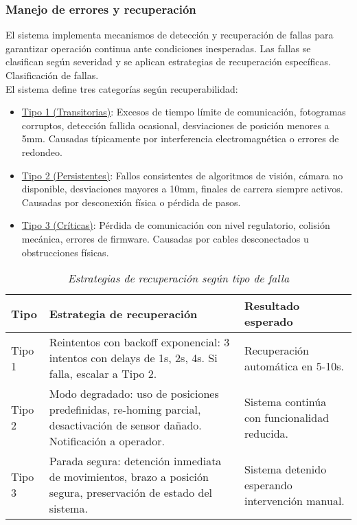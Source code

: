 \subsubsection{Manejo de errores y recuperación}

El sistema implementa mecanismos de detección y recuperación de fallas para garantizar operación continua ante condiciones inesperadas. Las fallas se clasifican según severidad y se aplican estrategias de recuperación específicas.\\

Clasificación de fallas.\\
\noindent
El sistema define tres categorías según recuperabilidad:

\begin{itemize}[label=$\bullet$]
    \item \underline{Tipo 1 (Transitorias)}: Excesos de tiempo límite de comunicación, fotogramas corruptos, detección fallida ocasional, desviaciones de posición menores a 5mm. Causadas típicamente por interferencia electromagnética o errores de redondeo.

    \item \underline{Tipo 2 (Persistentes)}: Fallos consistentes de algoritmos de visión, cámara no disponible, desviaciones mayores a 10mm, finales de carrera siempre activos. Causadas por desconexión física o pérdida de pasos.

    \item \underline{Tipo 3 (Críticas)}: Pérdida de comunicación con nivel regulatorio, colisión mecánica, errores de firmware. Causadas por cables desconectados u obstrucciones físicas.
\end{itemize}

\begin{table}[H]
\centering
\small
\begin{tabular}{|l|p{5.5cm}|p{5.5cm}|}
\hline
\textbf{Tipo} & \textbf{Estrategia de recuperación} & \textbf{Resultado esperado} \\
\hline
Tipo 1 & Reintentos con backoff exponencial: 3 intentos con delays de 1s, 2s, 4s. Si falla, escalar a Tipo 2. & Recuperación automática en 5-10s. \\
\hline
Tipo 2 & Modo degradado: uso de posiciones predefinidas, re-homing parcial, desactivación de sensor dañado. Notificación a operador. & Sistema continúa con funcionalidad reducida. \\
\hline
Tipo 3 & Parada segura: detención inmediata de movimientos, brazo a posición segura, preservación de estado del sistema. & Sistema detenido esperando intervención manual. \\
\hline
\end{tabular}
\caption{\textit{Estrategias de recuperación según tipo de falla}}
\label{tab:estrategias_recuperacion}
\end{table}

